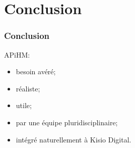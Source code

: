 \documentclass[table]{beamer}
\begin{document}
\section{Conclusion}

\begin{frame}
  \frametitle{Conclusion}

  APiHM:
  \begin{itemize}
  \item besoin avéré;
  \item réaliste;
  \item utile;
  \item par une équipe pluridisciplinaire;
  \item intégré naturellement à Kisio Digital.
  \end{itemize}
\end{frame}

\begin{frame}
  \titlepage
\end{frame}
\end{document}
